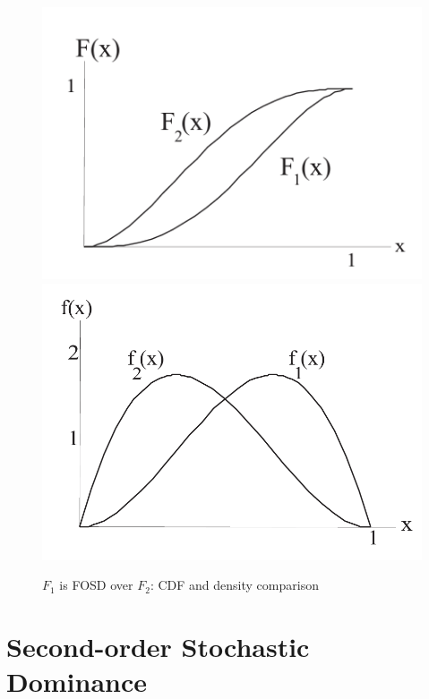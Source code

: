 \documentclass[11pt]{elegantbook}
\begin{document}
\begin{center}\begin{figure}[htbp]
    \centering
    \includegraphics[scale=0.2]{FOSD_1.png}
    \includegraphics[scale=0.2]{FOSD_2.png}
    \caption{$F_1$ is FOSD over $F_2$: CDF and density comparison}
    \label{}
\end{figure}\end{center}

\section{Second-order Stochastic Dominance}
\end{document}
